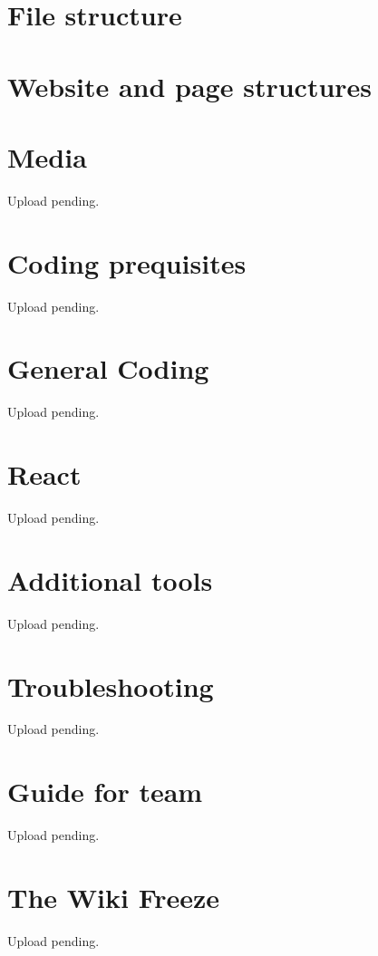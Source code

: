 \documentclass[a4paper, 11pt, twoside]{book}
\begin{document}
\chapter{File structure} \label{ch:structure}

\newpage
%
\chapter{Website and page structures} \label{ch:webstructure}

\newpage
%
\chapter{Media}\label{ch:media}
Upload pending.
%
\newpage
%
\chapter{Coding prequisites} \label{ch:cod}
Upload pending.
%
\newpage
%
\chapter{General Coding}  \label{ch:coding}
Upload pending.
%
\newpage
%
\chapter{React} \label{ch:react}
Upload pending.
%
%
\newpage
%
\chapter{Additional tools} \label{ch:addtools}
Upload pending.
%
\newpage
%
\chapter{Troubleshooting} \label{ch:troubleshooting}
Upload pending.
%
\newpage
%
\chapter{Guide for team} \label{ch:guide}
Upload pending.
%
\newpage
%
\chapter{The Wiki Freeze}  \label{ch:freeze}
Upload pending.
%
\newpage
%
\end{document}
